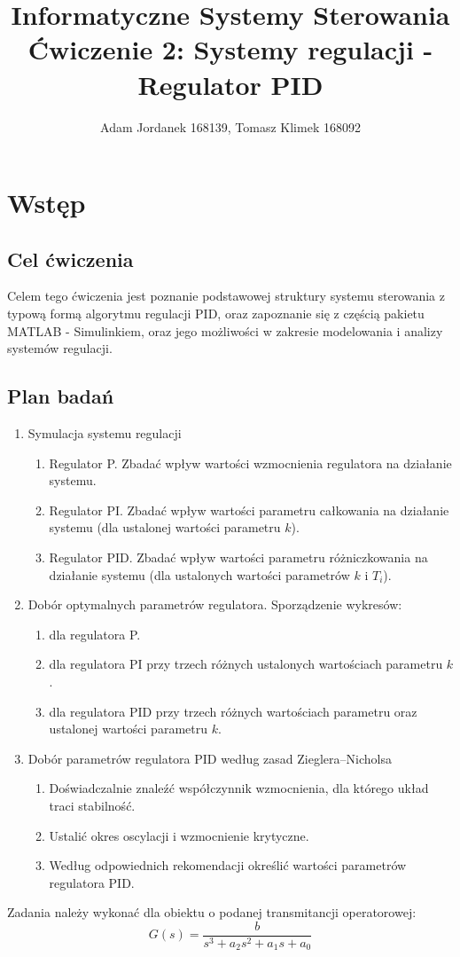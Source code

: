\documentclass[a4paper,10pt]{article}
\title{Informatyczne Systemy Sterowania \\ \large Ćwiczenie 2: Systemy regulacji - Regulator PID}
\author{Adam Jordanek 168139, Tomasz Klimek 168092}
\begin{document}
\maketitle

\section{Wstęp}\label{sec:wstęp}
\subsection{Cel ćwiczenia}
Celem tego ćwiczenia jest poznanie podstawowej struktury systemu sterowania z typową formą algorytmu regulacji PID, oraz zapoznanie się z częścią pakietu M\small ATLAB \normalsize - Simulinkiem, oraz jego możliwości w zakresie modelowania i analizy systemów regulacji.

\subsection{Plan badań} 
\begin{enumerate}
	\item Symulacja systemu regulacji
	\begin{enumerate}
		\item Regulator P. Zbadać wpływ wartości wzmocnienia regulatora na działanie systemu. 
	    \item Regulator   PI.   Zbadać  wpływ   wartości   parametru   całkowania   na   działanie   systemu 
       (dla ustalonej wartości parametru $k$). 
    	\item Regulator PID. Zbadać wpływ wartości parametru różniczkowania na działanie 
       systemu (dla ustalonych wartości parametrów $k$ i $T_i$). 
	\end{enumerate}
	\item Dobór optymalnych parametrów regulatora. Sporządzenie wykresów:
	\begin{enumerate}
		\item dla regulatora P. 
    	\item dla regulatora PI przy trzech różnych ustalonych wartościach parametru $k$.  
    	\item dla regulatora PID przy trzech różnych wartościach parametru oraz ustalonej wartości parametru $k$.
	\end{enumerate}
	\item Dobór parametrów regulatora PID według zasad Zieglera–Nicholsa
	\begin{enumerate}
		\item Doświadczalnie znaleźć współczynnik wzmocnienia, dla którego układ traci stabilność.
		\item Ustalić okres oscylacji i wzmocnienie krytyczne.
		\item Według odpowiednich rekomendacji określić wartości parametrów regulatora PID.
	\end{enumerate}
\end{enumerate}
Zadania należy wykonać dla obiektu o podanej transmitancji operatorowej:
\begin{equation} \label{eqn:transOS}
G(s) = \frac{b}{s^3 + a_2 s^2 + a_1 s + a_0}
\end{equation}
\end{document}
